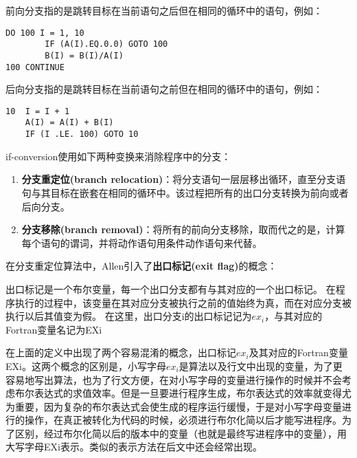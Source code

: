 \begin{definition}
前向分支指的是跳转目标在当前语句之后但在相同的循环中的语句，例如：
\begin{lstlisting}[language=FORTRAN]
	DO 100 I = 1, 10
		IF (A(I).EQ.0.0) GOTO 100
		B(I) = B(I)/A(I)
100	CONTINUE
\end{lstlisting}
\end{definition}

\begin{definition}
后向分支指的是跳转目标在当前语句之前但在相同的循环中的语句，例如：
\begin{lstlisting}[language=FORTRAN]
10	I = I + 1
	A(I) = A(I) + B(I)
	IF (I .LE. 100) GOTO 10
\end{lstlisting}
\end{definition}

if-conversion使用如下两种变换来消除程序中的分支：
\begin{enumerate}
\item \textbf{分支重定位(branch relocation)}：将分支语句一层层移出循环，直至分支语句与其目标在嵌套在相同的循环中。该过程把所有的出口分支转换为前向或者后向分支。
\item \textbf{分支移除(branch removal)}：将所有的前向分支移除，取而代之的是，计算每个语句的谓词，并将动作语句用条件动作语句来代替。
\end{enumerate}

在分支重定位算法中，Allen引入了\textbf{出口标记(exit flag)}的概念：

\begin{definition}
出口标记是一个布尔变量，每一个出口分支都有与其对应的一个出口标记。
在程序执行的过程中，该变量在其对应分支被执行之前的值始终为真，而在对应分支被执行以后其值变为假。
在这里，出口分支i的出口标记记为$ex_i$，与其对应的Fortran变量名记为EXi
\end{definition}

在上面的定义中出现了两个容易混淆的概念，出口标记$ex_i$及其对应的Fortran变量EXi。这两个概念的区别是，小写字母$ex_i$是算法以及行文中出现的变量，为了更容易地写出算法，也为了行文方便，在对小写字母的变量进行操作的时候并不会考虑布尔表达式的求值效率。但是一旦要进行程序生成，布尔表达式的效率就变得尤为重要，因为复杂的布尔表达式会使生成的程序运行缓慢，于是对小写字母变量进行的操作，在真正被转化为代码的时候，必须进行布尔化简以后才能写进程序。为了区别，经过布尔化简以后的版本中的变量（也就是最终写进程序中的变量），用大写字母EXi表示。类似的表示方法在后文中还会经常出现。

